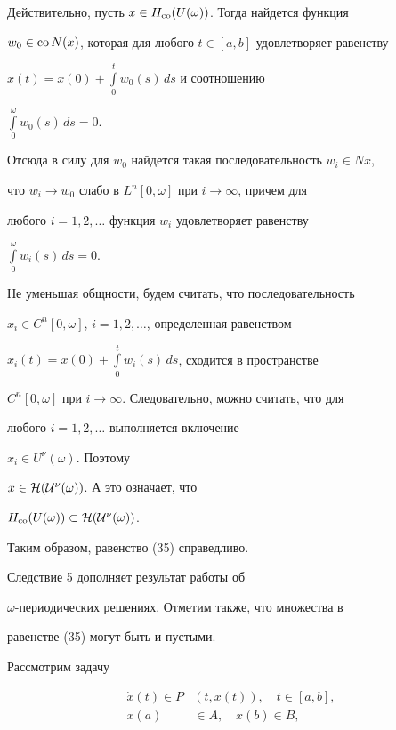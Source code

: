 Действительно, пусть $x\in H_{\operatorname{co}}(U(\omega))$. Тогда найдется функция


$w_0\in\operatorname{co} N(x)$, которая для любого $t\in[a,b]$ удовлетворяет равенству


$x(t)=x(0)+\int\limits_0^tw_0(s)\,ds$ и соотношению


$\int\limits_0^{\omega}w_0(s)\,ds=0$.


Отсюда в силу \cite{9} для $w_0$ найдется такая последовательность $w_i\in Nx$,


что $w_i\to w_0$ слабо в $L^n[0,\omega]$ при $i\to\infty$, причем для


любого $i=1,2,\dotsc$ функция $w_i$ удовлетворяет равенству


$\int\limits_0^{\omega}w_i(s)\,ds=0$.


Не уменьшая общности, будем считать, что последовательность


$x_i\in C^n[0,\omega]$, $i=1,2,\dotsc$, определенная равенством


$x_i(t)=x(0)+\int\limits_0^tw_i(s)\,ds$, сходится в пространстве


$C^n[0,\omega]$ при $i\to\infty$. Следовательно, можно считать, что для


любого $i=1,2,\dotsc$ выполняется включение


$x_i\in U^\nu(\omega)$. Поэтому


$x\in\cal H(U^\nu(\omega))$. А это означает, что


$H_{\operatorname{co}}(U(\omega))\subset\cal H(U^\nu(\omega))$.


Таким образом, равенство (35) справедливо.





\begin{note} Следствие 5 дополняет результат работы \cite{6} об


$\omega$-периодических решениях. Отметим также, что множества в


равенстве (35) могут быть и пустыми.


\end{note}





Рассмотрим задачу


\begin{equation}


\begin{split}


\Dot x(t)\in P&(t,x(t)),\quad t\in[a,b],\\


x(a)&\in A,\quad x(b)\in B,


\end{split}


\end{equation}


